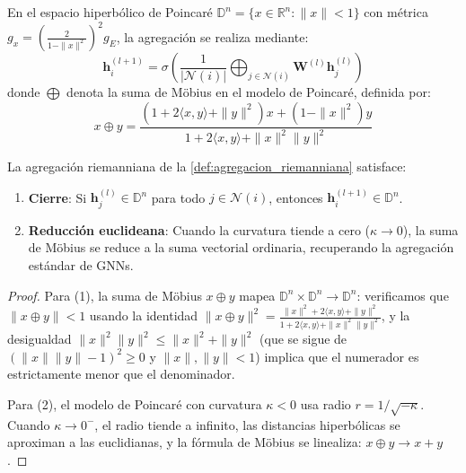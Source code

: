 \begin{definition}\label{def:agregacion_riemanniana}
En el espacio hiperbólico de Poincaré $\mathbb{D}^n = \{x \in \mathbb{R}^n : \|x\| < 1\}$ con métrica $g_x = \left(\frac{2}{1 - \|x\|^2}\right)^2 g_E$, la agregación se realiza mediante:
\begin{equation}
\mathbf{h}_i^{(l+1)} = \sigma\left(\frac{1}{|\mathcal{N}(i)|} \bigoplus_{j \in \mathcal{N}(i)} \mathbf{W}^{(l)} \mathbf{h}_j^{(l)}\right)
\end{equation}
donde $\bigoplus$ denota la suma de Möbius en el modelo de Poincaré, definida por:
\begin{equation}
x \oplus y = \frac{(1 + 2\langle x, y \rangle + \|y\|^2)x + (1 - \|x\|^2)y}{1 + 2\langle x, y \rangle + \|x\|^2\|y\|^2}
\end{equation}
\end{definition}

\begin{proposition}\label{prop:consistencia_agregacion_riemanniana}
La agregación riemanniana de la \autoref{def:agregacion_riemanniana} satisface:
\begin{enumerate}
    \item \textbf{Cierre}: Si $\mathbf{h}_j^{(l)} \in \mathbb{D}^n$ para todo $j \in \mathcal{N}(i)$, entonces $\mathbf{h}_i^{(l+1)} \in \mathbb{D}^n$.
    \item \textbf{Reducción euclideana}: Cuando la curvatura tiende a cero ($\kappa \to 0$), la suma de Möbius se reduce a la suma vectorial ordinaria, recuperando la agregación estándar de GNNs.
\end{enumerate}
\end{proposition}

\begin{proof}
Para (1), la suma de Möbius $x \oplus y$ mapea $\mathbb{D}^n \times \mathbb{D}^n \to \mathbb{D}^n$: verificamos que $\|x \oplus y\| < 1$ usando la identidad $\|x \oplus y\|^2 = \frac{\|x\|^2 + 2\langle x,y\rangle + \|y\|^2}{1 + 2\langle x,y\rangle + \|x\|^2\|y\|^2}$, y la desigualdad $\|x\|^2\|y\|^2 \leq \|x\|^2 + \|y\|^2$ (que se sigue de $(\|x\|\|y\| - 1)^2 \geq 0$ y $\|x\|, \|y\| < 1$) implica que el numerador es estrictamente menor que el denominador.

Para (2), el modelo de Poincaré con curvatura $\kappa < 0$ usa radio $r = 1/\sqrt{-\kappa}$. Cuando $\kappa \to 0^-$, el radio tiende a infinito, las distancias hiperbólicas se aproximan a las euclidianas, y la fórmula de Möbius se linealiza: $x \oplus y \to x + y$.
\end{proof}

